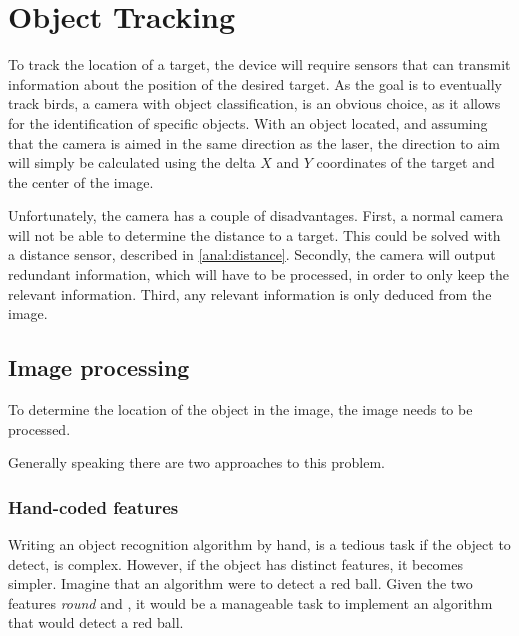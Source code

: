\section{Object Tracking}
\label{sec:obj_tracking}
To track the location of a target, the device will require sensors that can transmit information about the position of the desired target.
As the goal is to eventually track birds, a camera with object classification, is an obvious choice, as it allows for the identification of specific objects.
With an object located, and assuming that the camera is aimed in the same direction as the laser, the direction to aim will simply be calculated using the delta $X$ and $Y$ coordinates of the target and the center of the image.

Unfortunately, the camera has a couple of disadvantages.
First, a normal camera will not be able to determine the distance to a target.
This could be solved with a distance sensor, described in \ref{anal:distance}.
Secondly, the camera will output redundant information, which will have to be processed, in order to only keep the relevant information.
Third, any relevant information is only deduced from the image. 

\subsection{Image processing}
To determine the location of the object in the image, the image needs to be processed.

Generally speaking there are two approaches to this problem.
\subsubsection{Hand-coded features}
Writing an object recognition algorithm by hand, is a tedious task if the object to detect, is complex.
However, if the object has distinct features, it becomes simpler.
Imagine that an algorithm were to detect a red ball. 
Given the two features \textit{round} and , it would be a manageable task to implement an algorithm that would detect a red ball.

